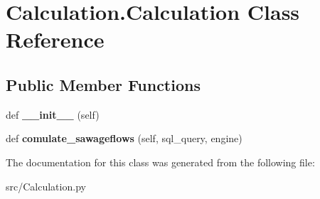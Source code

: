 \hypertarget{class_calculation_1_1_calculation}{}\section{Calculation.\+Calculation Class Reference}
\label{class_calculation_1_1_calculation}
\subsection*{Public Member Functions}
\begin{DoxyCompactItemize}
\item 
\mbox{\label{class_calculation_1_1_calculation_a7a5029b13f345c21aea6fc2318737a2d}} 
def {\bfseries \+\_\+\+\_\+init\+\_\+\+\_\+} (self)
\item 
\mbox{\label{class_calculation_1_1_calculation_ad90e562ee0f3bf85d966f10b61e9946b}} 
def {\bfseries comulate\+\_\+sawageflows} (self, sql\+\_\+query, engine)
\end{DoxyCompactItemize}


The documentation for this class was generated from the following file\+:\begin{DoxyCompactItemize}
\item 
src/Calculation.\+py\end{DoxyCompactItemize}
